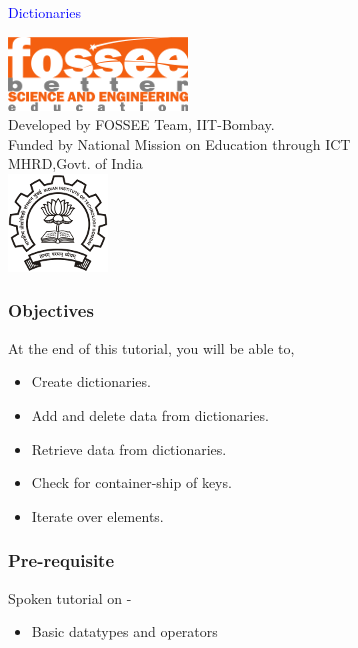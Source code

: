 \documentclass[presentation]{beamer}
\title{}
\author{FOSSEE}
\date{}
\begin{document}
\begin{frame}

\begin{center}
\vspace{12pt}
\textcolor{blue}{\huge Dictionaries}
\end{center}
\vspace{18pt}
\begin{center}
\vspace{10pt}
\includegraphics[scale=0.95]{../images/fossee-logo.png}\\
\vspace{5pt}
\scriptsize Developed by FOSSEE Team, IIT-Bombay. \\ 
\scriptsize Funded by National Mission on Education through ICT\\
\scriptsize  MHRD,Govt. of India\\
\includegraphics[scale=0.30]{../images/iitb-logo.png}\\
\end{center}
\end{frame}
\begin{frame}
\frametitle{Objectives}
\label{sec-2}

At the end of this tutorial, you will be able to,
\begin{itemize}
\item Create dictionaries.
\item Add and delete data from dictionaries.
\item Retrieve data from dictionaries.
\item Check for container-ship of keys.
\item Iterate over elements.
\end{itemize}
\end{frame}
\begin{frame}
\frametitle{Pre-requisite}
\label{sec-3}

Spoken tutorial on -
\begin{itemize}
\item Basic datatypes and operators
\end{itemize}
\end{frame}
\end{document}
